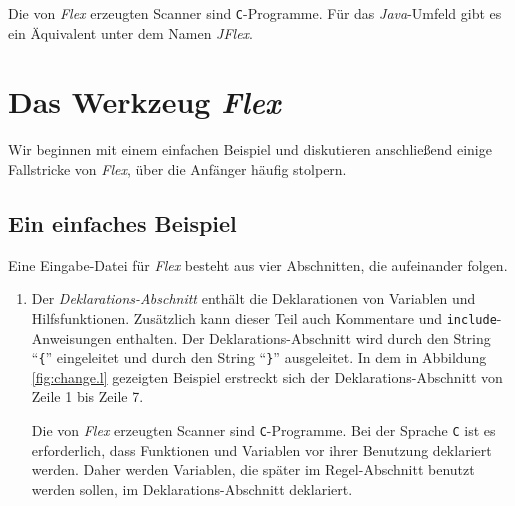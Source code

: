 Die von \textsl{Flex}\/ erzeugten Scanner sind \texttt{C}-Programme.  F\"ur das
\textsl{Java}-Umfeld gibt es ein \"Aquivalent unter dem Namen \textsl{JFlex}.

\section{Das Werkzeug \textsl{Flex}}
Wir beginnen mit einem einfachen Beispiel und diskutieren anschlie{\ss}end einige Fallstricke
von \textsl{Flex}, \"uber die Anf\"anger h\"aufig stolpern.
\subsection{Ein einfaches Beispiel}
Eine Eingabe-Datei f\"ur \textsl{Flex}\/ besteht aus vier Abschnitten, die aufeinander folgen.
\begin{enumerate}
\item Der \emph{Deklarations-Abschnitt} enth\"alt die Deklarationen von Variablen und Hilfsfunktionen.
      Zus\"atzlich kann dieser Teil auch Kommentare und \texttt{include}-Anweisungen
      enthalten.  Der Deklarations-Abschnitt wird durch den String ``\texttt{\{}''
      eingeleitet und durch den String ``\texttt{\}}'' ausgeleitet.
      In dem in Abbildung \ref{fig:change.l} gezeigten Beispiel erstreckt sich der
      Deklarations-Abschnitt von Zeile 1 bis Zeile 7.

      Die von \textsl{Flex}\/ erzeugten Scanner sind \texttt{C}-Programme.  Bei der Sprache
      \texttt{C} ist es erforderlich, dass Funktionen und Variablen vor ihrer Benutzung
      deklariert werden.  Daher werden Variablen, die sp\"ater im Regel-Abschnitt benutzt
      werden sollen, im Deklarations-Abschnitt deklariert.


\end{enumerate}
